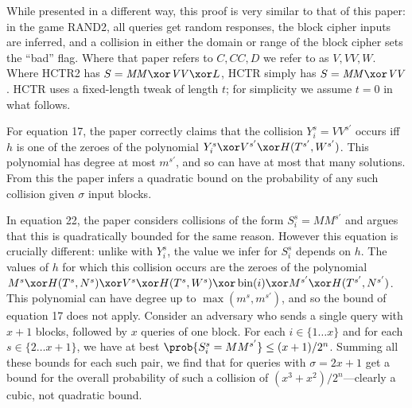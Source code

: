 \documentclass[letterpaper,11pt]{article}
\newcommand*{\MM}{\mathit{MM}}
\newcommand*{\VV}{\mathit{VV}}
\DeclareMathOperator{\fromint}{bin}
\begin{document}
While presented in a different way, this proof is very similar
to that of this paper: in the game RAND2, all queries get random
responses, the block cipher inputs are inferred, and a collision
in either the domain or range of the block cipher
sets the ``bad'' flag. Where that paper refers to 
\(C, \mathit{CC}, D\)
we refer to as \(V, VV, W\). Where HCTR2 has
\(S = \MM \xor \VV \xor L\), HCTR simply has
\(S = \MM \xor \VV\). HCTR uses a fixed-length tweak
of length \(t\); for simplicity we assume \(t = 0\)
in what follows.

For equation 17, the paper correctly claims that the collision
\(Y_i^s = VV^{s'}\) occurs iff \(h\) is one of the zeroes
of the polynomial \(Y_i^s \xor V^{s'} \xor H(T^{s'}, W^{s'})\).
This polynomial has degree at most
\(m^{s'}\), and so can have
at most that many solutions. From this the paper infers
a quadratic bound on the probability of any such collision
given \(\sigma\) input blocks.

In equation 22, the paper considers collisions of the form 
\(S_i^s = MM^{s'}\) and argues that this is
quadratically bounded for the same reason. However this equation
is crucially different: unlike with \(Y_i^s\), the value we
infer for \(S_i^s\) depends on \(h\). The values of \(h\)
for which this collision occurs are
the zeroes of the polynomial
\(M^s \xor H(T^s, N^s)
\xor V^s \xor H(T^s, W^s) \xor \fromint(i) 
\xor M^{s'} \xor H(T^{s'}, N^{s'})\).
This polynomial can have degree up to 
\(\max(m^s, m^{s'})\), and so the bound of
equation 17 does not apply.
Consider an adversary who
sends a single query with \(x+1\) blocks, followed by
\(x\) queries of one block. For each \(i \in \{1\ldots x\}\) and
for each \(s \in \{2 \ldots x + 1\}\), we have at best
\(\prob{S_i^s = MM^{s'}} \leq (x + 1)/2^n\). Summing
all these bounds for each such pair, we find that
for queries with \(\sigma = 2x + 1\)
get a bound for the overall probability of such a collision of 
\((x^3 + x^2)/2^n\)---clearly a cubic, not quadratic bound.
\end{document}
